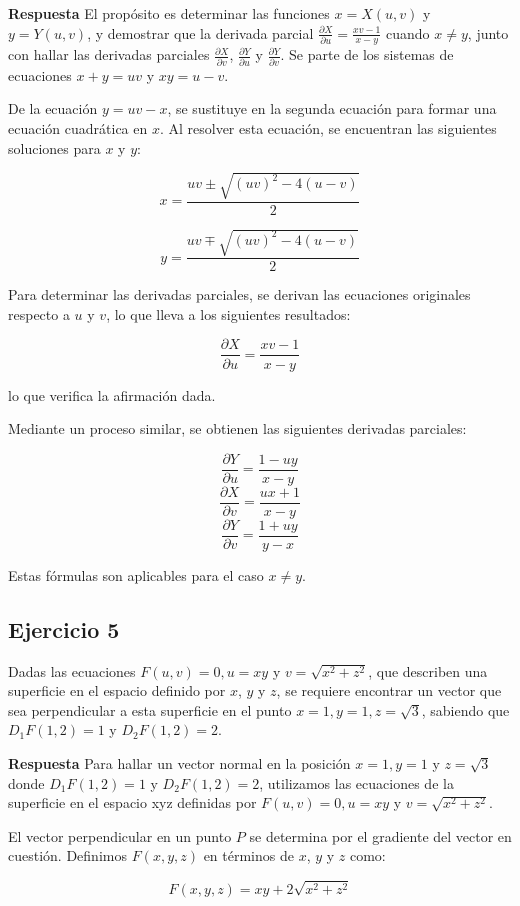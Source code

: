 \documentclass{report}
\begin{document}
\textbf{Respuesta} 
El propósito es determinar las funciones $x=X(u,v)$ y $y=Y(u,v)$, y demostrar que la derivada parcial $\frac{\partial X}{\partial u}=\frac{xv-1}{x-y}$ cuando $x \neq y$, junto con hallar las derivadas parciales $\frac{\partial X}{\partial v}$, $\frac{\partial Y}{\partial u}$ y $\frac{\partial Y}{\partial v}$. Se parte de los sistemas de ecuaciones $x+y=uv$ y $xy=u-v$.

De la ecuación $y=uv-x$, se sustituye en la segunda ecuación para formar una ecuación cuadrática en $x$. Al resolver esta ecuación, se encuentran las siguientes soluciones para $x$ y $y$:

\[x=\frac{uv \pm \sqrt{(uv)^2-4(u-v)}}{2}\]

\[y=\frac{uv \mp \sqrt{(uv)^2-4(u-v)}}{2}\]

Para determinar las derivadas parciales, se derivan las ecuaciones originales respecto a $u$ y $v$, lo que lleva a los siguientes resultados:

\[\frac{\partial X}{\partial u}=\frac{xv-1}{x-y}\]

lo que verifica la afirmación dada.

Mediante un proceso similar, se obtienen las siguientes derivadas parciales:

\[\frac{\partial Y}{\partial u}=\frac{1-uy}{x-y}\]
\[\frac{\partial X}{\partial v}=\frac{ux+1}{x-y}\]
\[\frac{\partial Y}{\partial v}=\frac{1+uy}{y-x}\]

Estas fórmulas son aplicables para el caso $x \neq y$.\subsection{Ejercicio 5}
Dadas las ecuaciones $F(u, v)=0, u=x y$ y $v=\sqrt{x^{2}+z^{2}}$, que describen una superficie en el espacio definido por $x$, $y$ y $z$, se requiere encontrar un vector que sea perpendicular a esta superficie en el punto $x=1, y=1, z=\sqrt{3}$, sabiendo que $D_{1} F(1,2)=1$ y $D_{2} F(1,2)=2$.

\textbf{Respuesta}
Para hallar un vector normal en la posición $x=1, y=1$ y $z=\sqrt{3}$ donde $D_1 F(1,2)=1$ y $D_2 F(1,2)=2$, utilizamos las ecuaciones de la superficie en el espacio xyz definidas por $F(u, v)=0, u=x y$ y $v=\sqrt{x^2+z^2}$.

El vector perpendicular en un punto $P$ se determina por el gradiente del vector en cuestión. Definimos $F(x, y, z)$ en términos de $x$, $y$ y $z$ como:

\begin{equation*}
F(x, y, z) = xy + 2\sqrt{x^2+z^2}
\end{equation*}
\end{document}
